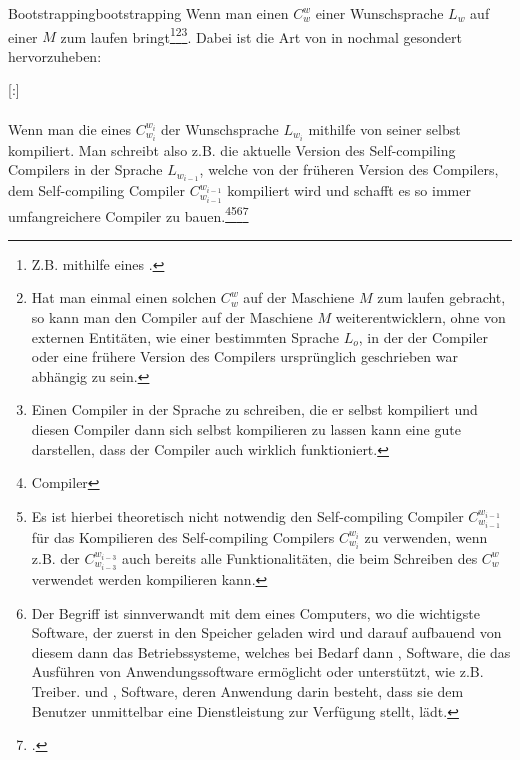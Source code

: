 \begin{Definition}{Bootstrapping}{bootstrapping}
  Wenn man einen  $C_{w}^{w}$ einer Wunschsprache $L_w$ auf einer  $M$ zum laufen bringt\footnote{Z.B. mithilfe eines .}\footnote{Hat man einmal einen solchen  $C_{w}^{w}$ auf der Maschiene $M$ zum laufen gebracht, so kann man den Compiler auf der Maschiene $M$ weiterentwicklern, ohne von externen Entitäten, wie einer bestimmten Sprache $L_o$, in der der Compiler oder eine frühere Version des Compilers ursprünglich geschrieben war abhängig zu sein.}\footnote{Einen Compiler in der Sprache zu schreiben, die er selbst kompiliert und diesen Compiler dann sich selbst kompilieren zu lassen kann eine gute  darstellen, dass der Compiler auch wirklich funktioniert.}. Dabei ist die Art von  in  nochmal gesondert hervorzuheben:

  \titleformat{\paragraph}[runin]{\normalfont\normalsize\bfseries}{}{0mm}{}[:]

  \paragraph{}\label{par:bootstrapping}\hspace{-0.25cm}
  Wenn man die  eines  $C_{w_i}^{w_i}$ der Wunschsprache $L_{w_i}$ mithilfe von  seiner selbst kompiliert. Man schreibt also z.B. die aktuelle Version des Self-compiling Compilers in der Sprache $L_{w_{i-1}}$, welche von der früheren Version des Compilers, dem Self-compiling Compiler $C_{w_{i-1}}^{w_{i-1}}$ kompiliert wird und schafft es so  immer umfangreichere Compiler zu bauen.\footnote{Compiler}\footnote{Es ist hierbei theoretisch nicht notwendig den  Self-compiling Compiler $C_{w_{i-1}}^{w_{i-1}}$ für das Kompilieren des  Self-compiling Compilers $C_{w_i}^{w_i}$ zu verwenden, wenn z.B. der  $C_{w_{i-3}}^{w_{i-3}}$ auch bereits alle Funktionalitäten, die beim Schreiben des  $C_w^w$ verwendet werden kompilieren kann.}\footnote{Der Begriff ist sinnverwandt mit dem  eines Computers, wo die wichtigste Software, der  zuerst in den Speicher geladen wird und darauf aufbauend von diesem dann das Betriebssysteme, welches bei Bedarf dann , Software, die das Ausführen von Anwendungssoftware ermöglicht oder unterstützt, wie z.B. Treiber. und , Software, deren Anwendung darin besteht, dass sie dem Benutzer unmittelbar eine Dienstleistung zur Verfügung stellt, lädt.}\footcite{earley_formalism_1970}
\end{Definition}


